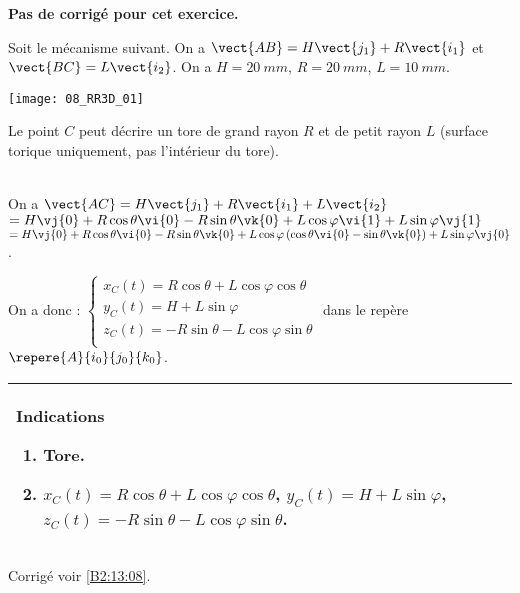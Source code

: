\normalfalse \difficiletrue \tdifficilefalse
\correctiontrue


\setcounter{numques}{0}
\ifcorrection
\else
\textbf{Pas de corrigé pour cet exercice.}
\fi

\ifprof
\else
Soit le mécanisme suivant. On a $\vect{AB}=H\vect{j_1}+R\vect{i_1}$ et $\vect{BC}=L\vect{i_2}$. On a $H=\SI{20}{mm}$, $R=\SI{20}{mm}$, $L=\SI{10}{mm}$. 
\begin{center}
\texttt{[image: 08\_RR3D\_01]}
\end{center}
\fi

\ifprof
Le point $C$ peut décrire un tore de grand rayon $R$ et de petit rayon $L$ (surface torique uniquement, pas l'intérieur du tore). 
\else
\fi

\ifprof ~\\
On  a  $\vect{AC}=H\vect{j_1}+R\vect{i_1}+L\vect{i_2}$ $=H\vj{0}+R\cos\theta\vi{0}-R\sin\theta\vk{0}+L\cos\varphi\vi{1}+L\sin\varphi\vj{1}$ 
$=H\vj{0}+R\cos\theta\vi{0}-R\sin\theta\vk{0}+L\cos\varphi\left(\cos\theta\vi{0}-\sin\theta\vk{0} \right)+L\sin\varphi\vj{0}$ .

On a donc :
$\left\{
\begin{array}{l}
x_C(t)=R\cos\theta+L\cos\varphi\cos\theta \\
y_C(t)= H+L\sin\varphi\\
z_C(t)=  -R\sin\theta-L\cos\varphi\sin\theta\\
\end{array}
\right.
$ dans le repère $\repere{A}{i_0}{j_0}{k_0}$.
\else
\fi

\ifprof
\else
\footnotesize
\begin{center}
\begin{tabular}{|p{.9\linewidth}|}
\hline
Indications
\begin{enumerate}
\item Tore.
\item $x_C(t)=R\cos\theta+L\cos\varphi\cos\theta$, $y_C(t)= H+L\sin\varphi$, $z_C(t)=  -R\sin\theta-L\cos\varphi\sin\theta$.
\end{enumerate} \\ \hline
\end{tabular}
\end{center}
\normalsize
\begin{flushright}
\footnotesize{Corrigé  voir \ref{B2:13:08}.}
\end{flushright}%
\fi
